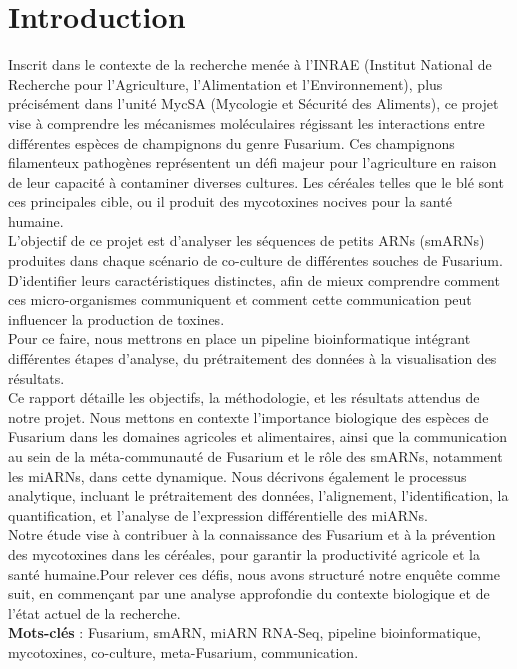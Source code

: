 \chapter*{Introduction}

Inscrit dans le contexte de la recherche menée à l'INRAE (Institut National de Recherche pour l'Agriculture, l'Alimentation et l'Environnement), plus précisément dans l'unité MycSA (Mycologie et Sécurité des Aliments), ce projet vise à comprendre les mécanismes moléculaires régissant les interactions entre différentes espèces de champignons du genre Fusarium. Ces champignons filamenteux pathogènes représentent un défi majeur pour l'agriculture en raison de leur capacité à contaminer diverses cultures. Les céréales telles que le blé sont ces principales cible, ou il produit des mycotoxines nocives pour la santé humaine.\\

L'objectif de ce projet est d'analyser les séquences de petits ARNs (smARNs) produites dans chaque scénario de co-culture de différentes souches de Fusarium. D'identifier leurs caractéristiques distinctes, afin de mieux comprendre comment ces micro-organismes communiquent et comment cette communication peut influencer la production de toxines.\\

Pour ce faire, nous mettrons en place un pipeline bioinformatique intégrant différentes étapes d'analyse, du prétraitement des données à la visualisation des résultats.\\

Ce rapport détaille les objectifs, la méthodologie, et les résultats attendus de notre projet. Nous mettons en contexte l'importance biologique des espèces de Fusarium dans les domaines agricoles et alimentaires, ainsi que la communication au sein de la méta-communauté de Fusarium et le rôle des smARNs, notamment les miARNs, dans cette dynamique. Nous décrivons également le processus analytique, incluant le prétraitement des données, l'alignement, l'identification, la quantification, et l'analyse de l'expression différentielle des miARNs.\\

Notre étude vise à contribuer à la connaissance des Fusarium et à la prévention des mycotoxines dans les céréales, pour garantir la productivité agricole et la santé humaine.Pour relever ces défis, nous avons structuré notre enquête comme suit, en commençant par une analyse approfondie du contexte biologique et de l'état actuel de la recherche.\\

\textbf{Mots-clés} : Fusarium, smARN, miARN RNA-Seq, pipeline bioinformatique, mycotoxines, co-culture, meta-Fusarium, communication.\\